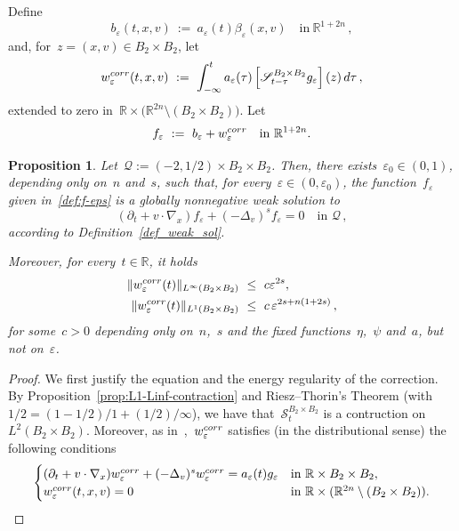 \documentclass[leqno,10pt]{amsart}
\theoremstyle{plain}
\newtheorem{prop}{Proposition}[section]
\theoremstyle{remark}
\numberwithin{equation}{section}
\def \d{\,{\rm d}}
\def\er{\mathbb{R}}
\newcommand{\eps}{\varepsilon}
\begin{document}
{Define
\begin{equation}\label{def:b-eps}
b_\eps(t,x,v) \ := \ a_\eps(t)\beta_\eps(x,v)
\quad
\text{in}~\er^{1+2n}\,,
\end{equation}
and, for~$z=(x,v)\in B_2\times B_2$, let
\begin{equation}\label{psharp:eq_correction}
w_\eps^{\rm corr}(t,x,v) \ := \ \int_{-\infty}^ta_\eps(\tau)\left[\mathscr{S}_{t-\tau}^{B_2\times B_2}g_\eps\right](z)\d\tau\,,
\end{equation}
extended to zero in~$\er\times\big(\er^{2n}\setminus(B_2\times B_2)\big)$.
Let
\begin{equation}\label{def:f-eps}
f_\eps \ := \ b_\eps+w_\eps^{\rm corr} \quad \text{in}~\er^{1+2n}.
\end{equation}

\begin{prop}\label{prop:solution}
Let~$\mathcal{Q}:= (-2,1/2) \times B_2 \times B_2$. Then, there exists~$\eps_0 \in (0,1)$, depending only on~$n$ and~$s$, such that, for every~$\eps\in(0,\eps_0)$, the function~$f_\eps$  given in~\eqref{def:f-eps} is a globally nonnegative weak solution to
\[
(\partial_t+v\cdot\nabla_x)f_\eps+(-\Delta_v)^sf_\eps=0
\quad\text{in } \mathcal{Q}\,,
\]
according to  Definition~{\rm\ref{def_weak_sol}}.

Moreover, for every~$t\in\er$, it holds
\begin{equation}\label{psharp:eq_correction_bounds}
\begin{aligned}
\|w_\eps^{\rm corr}(t)\|_{L^\infty(B_2\times B_2)} & \ \leq\ c\eps^{2s},\\
\|w_\eps^{\rm corr}(t)\|_{L^1(B_2\times B_2)} &\ \leq\ c\,\eps^{2s+n(1+2s)}\,,
\end{aligned}
\end{equation}
for some~$c>0$ depending only on~$n$,~$s$ and the fixed functions~$\eta$,~$\psi$ and~$a$, but not on~$\eps$.
\end{prop}

\begin{proof}
We first justify the equation and the energy regularity of the correction.
By Proposition~\ref{prop:L1-Linf-contraction} and Riesz--Thorin's Theorem (with
$1/2=(1-1/2)/1+(1/2)/\infty$), we have that~$\mathscr{S}_t^{B_2\times B_2}$ is a contruction on~$L^2(B_2\times B_2)$. Moreover, as in~\cite[Section~2]{KW24c},~$w_\eps^{\rm corr}$ satisfies (in the distributional sense)
the following conditions
\[
\begin{cases}
(\partial_t+v\cdot\nabla_x)w_\eps^{\rm corr}
 +(-\Delta_v)^sw_\eps^{\rm corr}=a_\eps(t)g_\eps
 &\text{in }\er\times B_2\times B_2,\\
w_\eps^{\rm corr}(t,x,v)=0
 &\text{in }\er
 \times (\er^{2n}\setminus(B_2\times B_2)).
\end{cases}
\]


\end{proof}}
\end{document}
